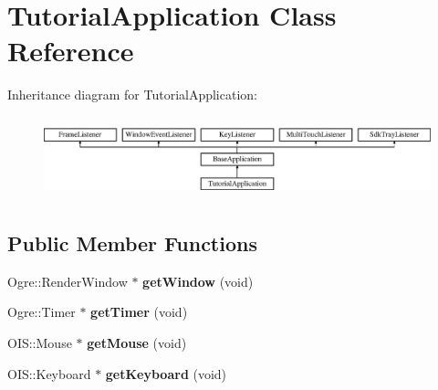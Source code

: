 \hypertarget{classTutorialApplication}{\section{Tutorial\-Application Class Reference}
\label{classTutorialApplication}
}
Inheritance diagram for Tutorial\-Application\-:\begin{figure}[H]
\begin{center}
\leavevmode
\includegraphics[height=2.382979cm]{classTutorialApplication}
\end{center}
\end{figure}
\subsection*{Public Member Functions}
\begin{DoxyCompactItemize}
\item 
\hypertarget{classTutorialApplication_a55c70dec8346e05b48685e5ac706743f}{Ogre\-::\-Render\-Window $\ast$ {\bfseries get\-Window} (void)}\label{classTutorialApplication_a55c70dec8346e05b48685e5ac706743f}

\item 
\hypertarget{classTutorialApplication_a82806ec1dc7bcffcc4bc5edb96d65ec5}{Ogre\-::\-Timer $\ast$ {\bfseries get\-Timer} (void)}\label{classTutorialApplication_a82806ec1dc7bcffcc4bc5edb96d65ec5}

\item 
\hypertarget{classTutorialApplication_a4061226032d08fa0692847e7c17b3932}{O\-I\-S\-::\-Mouse $\ast$ {\bfseries get\-Mouse} (void)}\label{classTutorialApplication_a4061226032d08fa0692847e7c17b3932}

\item 
\hypertarget{classTutorialApplication_a5f78595c495665cf6ec076e5d6c6c582}{O\-I\-S\-::\-Keyboard $\ast$ {\bfseries get\-Keyboard} (void)}\label{classTutorialApplication_a5f78595c495665cf6ec076e5d6c6c582}

\end{DoxyCompactItemize}
